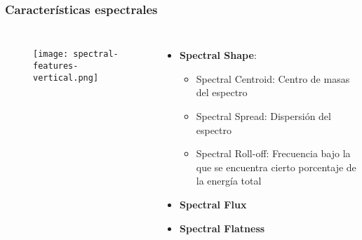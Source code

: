 \begin{frame}
    \frametitle{Características espectrales}

    \begin{columns}

        \begin{figure}[!h]
            \centering
            \texttt{[image: spectral-features-vertical.png]}
        \end{figure}


        \begin{itemize}
            \item<2-> \textbf{Spectral Shape}:
            \begin{itemize}
                \item Spectral Centroid: Centro de masas del espectro
                \item Spectral Spread: Dispersión del espectro
                \item Spectral Roll-off: Frecuencia bajo la que se encuentra cierto porcentaje de la energía total
            \end{itemize}
            \item<3-> \textbf{Spectral Flux}
            \item<4-> \textbf{Spectral Flatness}
        \end{itemize}

    \end{columns}
\end{frame}

